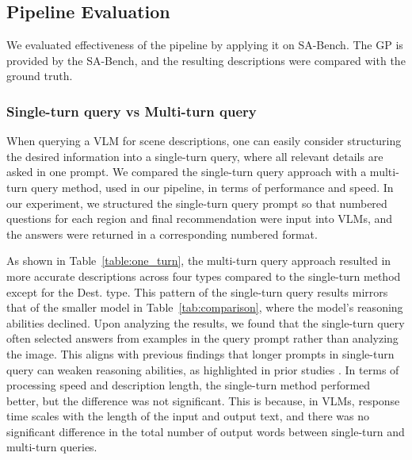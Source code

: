 \subsection{Pipeline Evaluation}
We evaluated effectiveness of the pipeline by applying it on SA-Bench. The GP is provided by the SA-Bench, and the resulting descriptions were compared with the ground truth.

\subsubsection{Single-turn query vs Multi-turn query}
\label{sec:single_vs_multi}
When querying a VLM for scene descriptions, one can easily consider structuring the desired information into a single-turn query, where all relevant details are asked in one prompt.
We compared the single-turn query approach with a multi-turn query method, used in our pipeline, in terms of performance and speed.
In our experiment, we structured the single-turn query prompt so that numbered questions for each region and final recommendation were input into VLMs, and the answers were returned in a corresponding numbered format.

As shown in Table~\ref{table:one_turn}, the multi-turn query approach resulted in more accurate descriptions across four types compared to the single-turn method except for the Dest. type. 
This pattern of the single-turn query results mirrors that of the smaller model in Table~\ref{tab:comparison}, where the model's reasoning abilities declined. 
Upon analyzing the results, we found that the single-turn query often selected answers from examples in the query prompt rather than analyzing the image.
This aligns with previous findings that longer prompts in single-turn query can weaken reasoning abilities, as highlighted in prior studies \cite{Han2024lminfinite}\cite{levy2024tasktokensimpactinput}. 
In terms of processing speed and description length, the single-turn method performed better, but the difference was not significant. 
This is because, in VLMs, response time scales with the length of the input and output text, and there was no significant difference in the total number of output words between single-turn and multi-turn queries.

